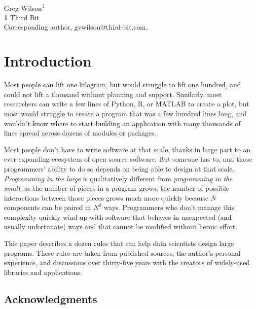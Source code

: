 \documentclass[10pt,letterpaper]{article}
\begin{document}
\vspace*{0.2in}

\begin{flushleft}
{\Large
\textbf{}
}
\newline
\\
{Greg Wilson}\textsuperscript{1{\ddag}}
\\
\bigskip
\textbf{1} Third Bit\\
{\ddag} Corresponding author, gvwilson@third-bit.com.
\end{flushleft}

\section*{Introduction}

Most people can lift one kilogram,
but would struggle to lift one hundred,
and could not lift a thousand without planning and support.
Similarly,
most researchers can write a few lines of Python, R, or MATLAB to create a plot,
but most would struggle to create a program that was a few hundred lines long,
and wouldn't know where to start building an application with many thousands of lines
spread across dozens of modules or packages.

Most people don't have to write software at that scale,
thanks in large part to an ever-expanding ecosystem of open source software.
But someone has to,
and those programmers' ability to do so depends on being able to design at that scale.
\emph{Programming in the large} is qualitatively different from \emph{programming in the small}.
as the number of pieces in a program grows,
the number of possible interactions between those pieces grows much more quickly
because $N$ components can be paired in $N^2$ ways.
Programmers who don't manage this complexity
quickly wind up with software that behaves in unexpected (and usually unfortunate) ways
and that cannot be modified without heroic effort.

This paper describes a dozen rules that can help data scientists design large programs.
These rules are taken from published sources,
the author's personal experience,
and discussions over thirty-five years with the creators of widely-used libraries and applications.

\subsection*{Acknowledgments}
\end{document}
